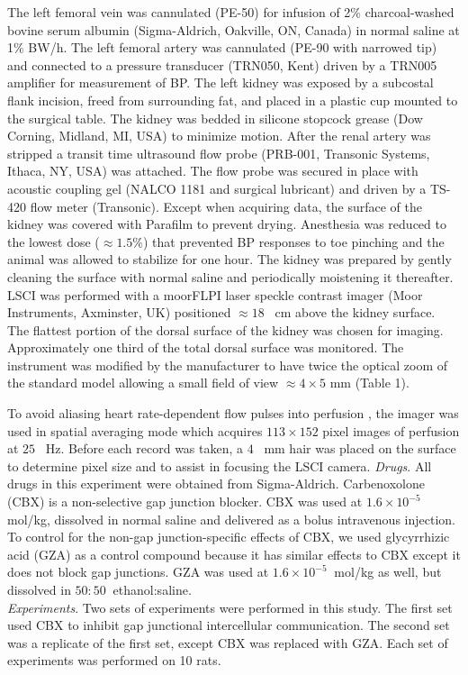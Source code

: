 	The left femoral vein was cannulated (PE-50) for infusion of 2\% charcoal-washed bovine serum albumin (Sigma-Aldrich, Oakville, ON, Canada) in normal saline at 1\% BW/h. The left femoral artery was cannulated (PE-90 with narrowed tip) and connected to a pressure transducer (TRN050, Kent) driven by a TRN005 amplifier for measurement of BP. The left kidney was exposed by a subcostal flank incision, freed from surrounding fat, and placed in a plastic cup mounted to the surgical table. The kidney was bedded in silicone stopcock grease (Dow Corning, Midland, MI, USA) to minimize motion. After the renal artery was stripped a transit time ultrasound flow probe (PRB-001, Transonic Systems, Ithaca, NY, USA) was attached. The flow probe was secured in place with acoustic coupling gel (NALCO 1181 and surgical lubricant) and driven by a TS-420 flow meter (Transonic). Except when acquiring data, the surface of the kidney was covered with Parafilm to prevent drying. Anesthesia was reduced to the lowest dose ($\approx 1.5\%$) that prevented BP responses to toe pinching and the animal was allowed to stabilize for one hour.
	The kidney was prepared by gently cleaning the surface with normal saline and periodically moistening it thereafter. LSCI was performed with a moorFLPI laser speckle contrast imager (Moor Instruments, Axminster, UK) positioned $\approx 18$ \ cm above the kidney surface. The flattest portion of the dorsal surface of the kidney was chosen for imaging. Approximately one third of the total dorsal surface was monitored. The instrument was modified by the manufacturer to have twice the optical zoom of the standard model allowing a small field of view $\approx 4\times 5$ mm (Table 1).
	
	To avoid aliasing heart rate-dependent flow pulses into perfusion \cite{Scully13}, the imager was used in spatial averaging mode which acquires $113 \times 152$ pixel images of perfusion at $25$ \ Hz. Before each record was taken, a $4$ \ mm hair was placed on the surface to determine pixel size and to assist in focusing the LSCI camera. 
	\emph{Drugs}. All drugs in this experiment were obtained from Sigma-Aldrich. Carbenoxolone (CBX) is a non-selective gap junction blocker. CBX was used at $1.6 \times 10^{-5} \ $ mol/kg, dissolved in normal saline and delivered as a bolus intravenous injection. To control for the non-gap junction-specific effects of CBX, we used glycyrrhizic acid (GZA) as a control compound because it has similar effects to CBX except it does not block gap junctions. GZA was used at $1.6 \times 10^{-5} \ $ mol/kg as well, but dissolved in $50:50 \ $ ethanol:saline. \\
	\emph{Experiments}. Two sets of experiments were performed in this study. The first set used CBX to inhibit gap junctional intercellular communication. The second set was a replicate of the first set, except CBX was replaced with GZA. Each set of experiments was performed on 10 rats.
	
